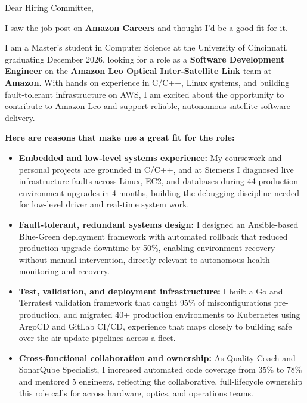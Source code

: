 \documentclass[11pt]{letter}
\date{}
\begin{document}
\begin{letter}{}

\opening{Dear Hiring Committee,}

I saw the job post on \textbf{Amazon Careers} and thought I'd be a good fit for it.

I am a Master's student in Computer Science at the University of Cincinnati, graduating December 2026, looking for a role as a \textbf{Software Development Engineer} on the \textbf{Amazon Leo Optical Inter-Satellite Link} team at \textbf{Amazon}. With hands on experience in C/C++, Linux systems, and building fault-tolerant infrastructure on AWS, I am excited about the opportunity to contribute to Amazon Leo and support reliable, autonomous satellite software delivery.

\textbf{Here are reasons that make me a great fit for the role:}

\begin{itemize}[leftmargin=*, itemsep=0.45em]
    \item \textbf{Embedded and low-level systems experience:} My coursework and personal projects are grounded in C/C++, and at Siemens I diagnosed live infrastructure faults across Linux, EC2, and databases during 44 production environment upgrades in 4 months, building the debugging discipline needed for low-level driver and real-time system work.

    \item \textbf{Fault-tolerant, redundant systems design:} I designed an Ansible-based Blue-Green deployment framework with automated rollback that reduced production upgrade downtime by 50\%, enabling environment recovery without manual intervention, directly relevant to autonomous health monitoring and recovery.

    \item \textbf{Test, validation, and deployment infrastructure:} I built a Go and Terratest validation framework that caught 95\% of misconfigurations pre-production, and migrated 40+ production environments to Kubernetes using ArgoCD and GitLab CI/CD, experience that maps closely to building safe over-the-air update pipelines across a fleet.

    \item \textbf{Cross-functional collaboration and ownership:} As Quality Coach and SonarQube Specialist, I increased automated code coverage from 35\% to 78\% and mentored 5 engineers, reflecting the collaborative, full-lifecycle ownership this role calls for across hardware, optics, and operations teams.
\end{itemize}


\end{letter}
\end{document}
